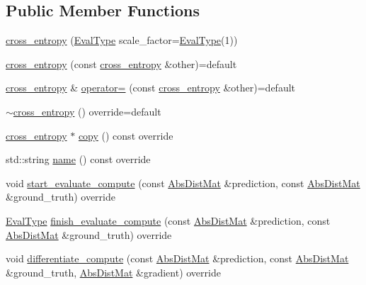 \subsection*{Public Member Functions}
\begin{DoxyCompactItemize}
\item 
\hyperlink{classlbann_1_1cross__entropy_a68520e75b1613caa6e845b26199df0ee}{cross\+\_\+entropy} (\hyperlink{base_8hpp_a3266f5ac18504bbadea983c109566867}{Eval\+Type} scale\+\_\+factor=\hyperlink{base_8hpp_a3266f5ac18504bbadea983c109566867}{Eval\+Type}(1))
\item 
\hyperlink{classlbann_1_1cross__entropy_adb865fd99d2e8c9b3da748956363ed7f}{cross\+\_\+entropy} (const \hyperlink{classlbann_1_1cross__entropy}{cross\+\_\+entropy} \&other)=default
\item 
\hyperlink{classlbann_1_1cross__entropy}{cross\+\_\+entropy} \& \hyperlink{classlbann_1_1cross__entropy_a818f473e9af3e417dfdf2c79f8f2c2af}{operator=} (const \hyperlink{classlbann_1_1cross__entropy}{cross\+\_\+entropy} \&other)=default
\item 
\hyperlink{classlbann_1_1cross__entropy_a9876fd9cc40a76acb219a875f66dfdb7}{$\sim$cross\+\_\+entropy} () override=default
\item 
\hyperlink{classlbann_1_1cross__entropy}{cross\+\_\+entropy} $\ast$ \hyperlink{classlbann_1_1cross__entropy_a5d709e7cf0a3a260ba8d5c558aebda88}{copy} () const override
\item 
std\+::string \hyperlink{classlbann_1_1cross__entropy_a142c9188b0a251ddaf0325e1f310f205}{name} () const override
\item 
void \hyperlink{classlbann_1_1cross__entropy_a5167b7709499516c6a4dbebfc561f6a7}{start\+\_\+evaluate\+\_\+compute} (const \hyperlink{base_8hpp_a9a697a504ae84010e7439ffec862b470}{Abs\+Dist\+Mat} \&prediction, const \hyperlink{base_8hpp_a9a697a504ae84010e7439ffec862b470}{Abs\+Dist\+Mat} \&ground\+\_\+truth) override
\item 
\hyperlink{base_8hpp_a3266f5ac18504bbadea983c109566867}{Eval\+Type} \hyperlink{classlbann_1_1cross__entropy_a85d6937dc70217062f7b45cb678ea1f9}{finish\+\_\+evaluate\+\_\+compute} (const \hyperlink{base_8hpp_a9a697a504ae84010e7439ffec862b470}{Abs\+Dist\+Mat} \&prediction, const \hyperlink{base_8hpp_a9a697a504ae84010e7439ffec862b470}{Abs\+Dist\+Mat} \&ground\+\_\+truth) override
\item 
void \hyperlink{classlbann_1_1cross__entropy_a5a91b6dac7d27980c47f6fd818963d1b}{differentiate\+\_\+compute} (const \hyperlink{base_8hpp_a9a697a504ae84010e7439ffec862b470}{Abs\+Dist\+Mat} \&prediction, const \hyperlink{base_8hpp_a9a697a504ae84010e7439ffec862b470}{Abs\+Dist\+Mat} \&ground\+\_\+truth, \hyperlink{base_8hpp_a9a697a504ae84010e7439ffec862b470}{Abs\+Dist\+Mat} \&gradient) override
\end{DoxyCompactItemize}
